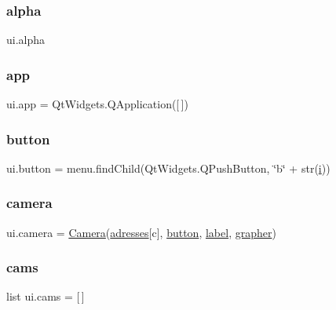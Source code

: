 \subsubsection{\texorpdfstring{alpha}{alpha}}
{\footnotesize\ttfamily ui.\+alpha}

\mbox{\label{namespaceui_aa319e24d35c85648c0d34ea8d6c77912}} 
\subsubsection{\texorpdfstring{app}{app}}
{\footnotesize\ttfamily ui.\+app = Qt\+Widgets.\+Q\+Application(\mbox{[}$\,$\mbox{]})}

\mbox{\label{namespaceui_af6332480b18dc17e84cc4045f3330aac}} 
\subsubsection{\texorpdfstring{button}{button}}
{\footnotesize\ttfamily ui.\+button = menu.\+find\+Child(Qt\+Widgets.\+Q\+Push\+Button, \char`\"{}b\char`\"{} + str(\hyperlink{namespaceui_a864c62b3f0bd6745e0d18d87e70defe6}{i}))}

\mbox{\label{namespaceui_afb37972e0352b1558875ce89d7fdc0ad}} 
\subsubsection{\texorpdfstring{camera}{camera}}
{\footnotesize\ttfamily ui.\+camera = \hyperlink{classui_1_1_camera}{Camera}(\hyperlink{namespaceui_aad45a9db615017fdd003dcd9e271a9b9}{adresses}\mbox{[}c\mbox{]}, \hyperlink{namespaceui_af6332480b18dc17e84cc4045f3330aac}{button}, \hyperlink{namespaceui_affd9697385ba4bf6c290a661c5a9b6cd}{label}, \hyperlink{namespaceui_a93ae6b16cc6a8252e4bf5a5d2ed94aa6}{grapher})}

\mbox{\label{namespaceui_a8e2392b67718029c7ae06c8e4f79b9dc}} 
\subsubsection{\texorpdfstring{cams}{cams}}
{\footnotesize\ttfamily list ui.\+cams = \mbox{[}$\,$\mbox{]}}

